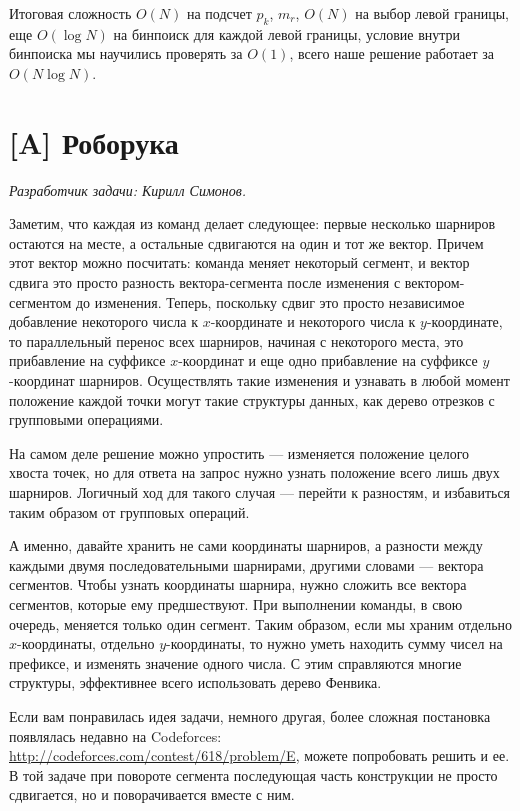 \documentclass[12pt]{article}
\theoremstyle{definition}
\begin{document}
Итоговая сложность $O(N)$ на подсчет $p_k$, $m_r$, $O(N)$ на выбор левой границы,
еще $O(\log N)$ на бинпоиск для каждой левой границы, условие внутри бинпоиска
мы научились проверять за $O(1)$, всего наше решение работает за $O(N \log N)$.

\section{[A] Роборука}
\textit{Разработчик задачи: Кирилл Симонов.}

Заметим, что каждая из команд делает следующее: первые несколько шарниров остаются на месте,
а остальные сдвигаются на один и тот же вектор. Причем этот вектор можно посчитать:
команда меняет некоторый сегмент, и вектор сдвига это просто разность вектора-сегмента
после изменения с вектором-сегментом до изменения. Теперь, поскольку сдвиг это просто
независимое добавление некоторого числа к $x$-координате и некоторого числа к
$y$-координате, то параллельный перенос всех шарниров, начиная с некоторого места, это
прибавление на суффиксе $x$-координат и еще одно прибавление на суффиксе $y$-координат
шарниров. Осуществлять такие изменения и узнавать в любой момент положение каждой
точки могут такие структуры данных, как дерево отрезков с групповыми операциями.

На самом деле решение можно упростить --- изменяется положение целого хвоста точек, но
для ответа на запрос нужно узнать положение всего лишь двух шарниров. Логичный ход для
такого случая --- перейти к разностям, и избавиться таким образом от групповых операций.

А именно, давайте хранить не сами координаты шарниров, а разности между каждыми
двумя последовательными шарнирами, другими словами --- вектора сегментов. Чтобы
узнать координаты шарнира, нужно сложить все вектора сегментов, которые ему
предшествуют. При выполнении команды, в свою очередь, меняется только один сегмент.
Таким образом, если мы храним отдельно $x$-координаты, отдельно $y$-координаты, то
нужно уметь находить сумму чисел на префиксе, и изменять значение одного числа.
С этим справляются многие структуры, эффективнее всего использовать дерево Фенвика.

Если вам понравилась идея задачи, немного другая, более сложная постановка появлялась недавно на Codeforces:
\url{http://codeforces.com/contest/618/problem/E}, можете попробовать решить и ее.
В той задаче при повороте сегмента
последующая часть конструкции не просто сдвигается, но и поворачивается вместе с ним.
\end{document}
